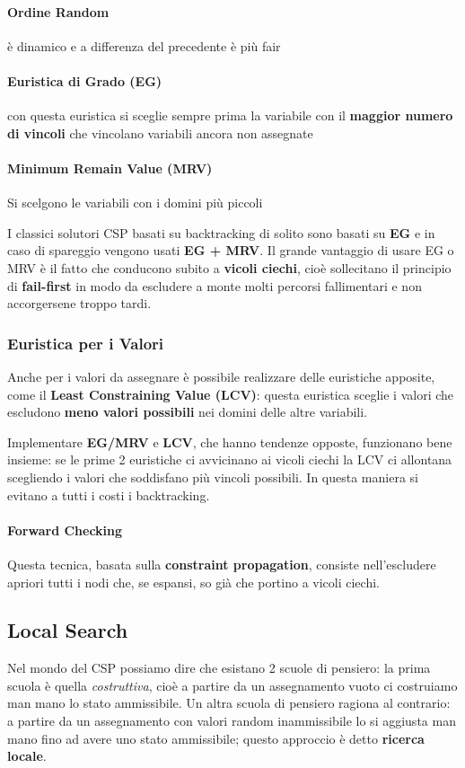 \paragraph{Ordine Random}è dinamico e a differenza del precedente è più fair
\paragraph{Euristica di Grado (EG)}con questa euristica si sceglie sempre prima la variabile con il \textbf{maggior numero di vincoli} che 
vincolano variabili ancora non assegnate
\paragraph{Minimum Remain Value (MRV)}Si scelgono le variabili con i domini più piccoli

I classici solutori CSP basati su backtracking di solito sono basati su \textbf{EG} e in caso di spareggio vengono usati \textbf{EG + MRV}.
Il grande vantaggio di usare EG o MRV è il fatto che conducono subito a \textbf{vicoli ciechi}, cioè sollecitano il principio di
\textbf{fail-first} in modo da escludere a monte molti percorsi fallimentari e non accorgersene troppo tardi.
\subsubsection{Euristica per i Valori}
Anche per i valori da assegnare è possibile realizzare delle euristiche apposite, come il \textbf{Least Constraining Value (LCV)}:
questa euristica sceglie i valori che escludono \textbf{meno valori possibili} nei domini delle altre variabili.

Implementare \textbf{EG/MRV} e \textbf{LCV}, che hanno tendenze opposte, funzionano bene insieme: se le prime 2 euristiche ci avvicinano ai vicoli ciechi
la LCV ci allontana scegliendo i valori che soddisfano più vincoli possibili. In questa maniera si evitano a tutti i costi i backtracking.

\paragraph{Forward Checking}
Questa tecnica, basata sulla \textbf{constraint propagation}, consiste nell'escludere apriori tutti i nodi che, se espansi, so già
che portino a vicoli ciechi.

\subsection{Local Search}
Nel mondo del CSP possiamo dire che esistano 2 scuole di pensiero: la prima scuola è quella \textit{costruttiva}, cioè a partire da un assegnamento
vuoto ci costruiamo man mano lo stato ammissibile. Un altra scuola di pensiero ragiona al contrario: a partire da un assegnamento con valori random inammissibile
lo si aggiusta man mano fino ad avere uno stato ammissibile; questo approccio è detto \textbf{ricerca locale}.
